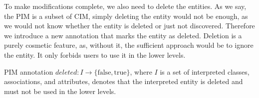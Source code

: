 To make modifications complete, we also need to delete the entities. As we say, the PIM is a subset of CIM, simply deleting the entity would not be enough, as we would not know whether the entity is deleted or just not discovered. Therefore we introduce a new annotation that marks the entity as deleted. Deletion is a purely cosmetic feature, as, without it, the sufficient approach would be to ignore the entity. It only forbids users to use it in the lower levels.

\begin{definition}[deleted]
    PIM annotation $deleted: I \rightarrow \{\textrm{false}, \textrm{true}\}$, where $I$ is a set of interpreted classes, associations, and attributes, denotes that the interpreted entity is deleted and must not be used in the lower levels.
\end{definition}









